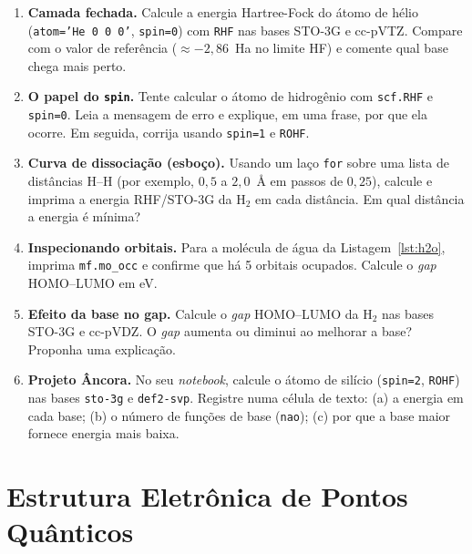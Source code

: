 \documentclass[11pt,a4paper,openany]{book}
\newcommand{\code}[1]{\texttt{#1}}
\begin{document}
\begin{enumerate}[leftmargin=*,label=\textbf{2.\arabic*}]
  \item \textbf{Camada fechada.} Calcule a energia Hartree-Fock do átomo de hélio
        (\code{atom='He 0 0 0'}, \code{spin=0}) com \code{RHF} nas bases STO-3G e
        cc-pVTZ. Compare com o valor de referência ($\approx -2{,}86$~Ha no limite
        HF) e comente qual base chega mais perto.

  \item \textbf{O papel do \code{spin}.} Tente calcular o átomo de hidrogênio com
        \code{scf.RHF} e \code{spin=0}. Leia a mensagem de erro e explique, em uma
        frase, por que ela ocorre. Em seguida, corrija usando \code{spin=1} e
        \code{ROHF}.

  \item \textbf{Curva de dissociação (esboço).} Usando um laço \code{for} sobre uma
        lista de distâncias H--H (por exemplo, $0{,}5$ a $2{,}0$~Å em passos de
        $0{,}25$), calcule e imprima a energia RHF/STO-3G da H$_2$ em cada
        distância. Em qual distância a energia é mínima?

  \item \textbf{Inspecionando orbitais.} Para a molécula de água da
        Listagem~\ref{lst:h2o}, imprima \code{mf.mo\_occ} e confirme que há 5
        orbitais ocupados. Calcule o \emph{gap} HOMO--LUMO em eV.

  \item \textbf{Efeito da base no gap.} Calcule o \emph{gap} HOMO--LUMO da H$_2$
        nas bases STO-3G e cc-pVDZ. O \emph{gap} aumenta ou diminui ao melhorar a
        base? Proponha uma explicação.

  \item \textbf{Projeto Âncora.} No seu \emph{notebook}, calcule o átomo de
        silício (\code{spin=2}, \code{ROHF}) nas bases \code{sto-3g} e
        \code{def2-svp}. Registre numa célula de texto: (a) a energia em cada base;
        (b) o número de funções de base (\code{nao}); (c) por que a base maior
        fornece energia mais baixa.
\end{enumerate}

\part{Estrutura Eletrônica de Pontos Quânticos}
\end{document}
